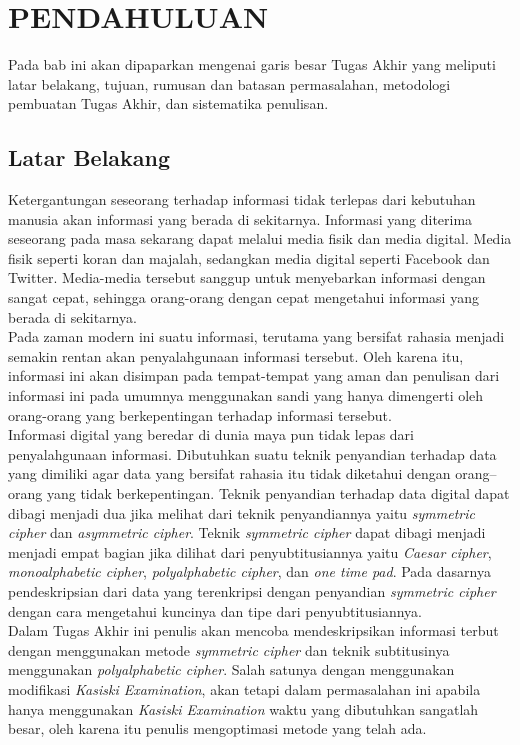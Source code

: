 \chapter{PENDAHULUAN}
  Pada bab ini akan dipaparkan mengenai garis besar Tugas Akhir yang meliputi latar belakang, tujuan, rumusan dan batasan permasalahan, metodologi pembuatan Tugas Akhir, dan sistematika penulisan.
  
  \section{Latar Belakang}	
	\indent Ketergantungan seseorang terhadap informasi tidak terlepas dari kebutuhan manusia akan informasi yang berada di sekitarnya. Informasi yang diterima seseorang pada masa sekarang dapat melalui media fisik dan media digital. Media fisik seperti koran dan majalah, sedangkan media digital seperti Facebook dan Twitter. Media-media tersebut sanggup untuk menyebarkan informasi dengan sangat cepat, sehingga orang-orang dengan cepat mengetahui informasi yang berada di sekitarnya.
    \\
    \indent Pada zaman modern ini suatu informasi, terutama yang bersifat rahasia menjadi semakin rentan akan penyalahgunaan informasi tersebut. Oleh karena itu, informasi ini akan disimpan pada tempat-tempat yang aman dan penulisan dari informasi ini pada umumnya menggunakan sandi yang hanya dimengerti oleh orang-orang yang berkepentingan terhadap informasi tersebut.
    \\
	\indent Informasi digital yang beredar di dunia maya pun tidak lepas dari penyalahgunaan informasi. Dibutuhkan suatu teknik penyandian terhadap data yang dimiliki agar data yang bersifat rahasia itu tidak diketahui dengan orang–orang yang tidak berkepentingan. Teknik penyandian terhadap data digital dapat dibagi menjadi dua jika melihat dari teknik penyandiannya yaitu \textit{symmetric cipher} dan \textit{asymmetric cipher}. Teknik \textit{symmetric cipher} dapat dibagi menjadi menjadi empat bagian jika dilihat dari penyubtitusiannya yaitu \textit{Caesar cipher},\textit{ monoalphabetic cipher}, \textit{polyalphabetic cipher}, dan \textit{one time pad}. Pada dasarnya pendeskripsian dari data yang terenkripsi dengan penyandian \textit{symmetric cipher} dengan cara mengetahui kuncinya dan tipe dari penyubtitusiannya.
	\\
	\indent Dalam Tugas Akhir ini penulis akan mencoba mendeskripsikan informasi terbut dengan menggunakan metode \textit{symmetric cipher} dan teknik subtitusinya menggunakan \textit{polyalphabetic cipher}. Salah satunya dengan menggunakan modifikasi \textit{Kasiski Examination}, akan tetapi dalam permasalahan ini apabila hanya menggunakan \textit{Kasiski Examination} waktu yang dibutuhkan sangatlah besar, oleh karena itu penulis mengoptimasi metode yang telah ada.
    
